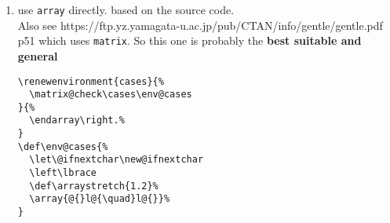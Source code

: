 \documentclass{article}
\begin{document}
\begin{enumerate}
    \item use \verb|array| directly. based on the source code.\\
          Also see https://ftp.yz.yamagata-u.ac.jp/pub/CTAN/info/gentle/gentle.pdf p51 which uses \verb|matrix|. So this one is probably the \textbf{best suitable and general}
          \begin{verbatim}
\renewenvironment{cases}{%
  \matrix@check\cases\env@cases
}{%
  \endarray\right.%
}
\def\env@cases{%
  \let\@ifnextchar\new@ifnextchar
  \left\lbrace
  \def\arraystretch{1.2}%
  \array{@{}l@{\quad}l@{}}%
}
          \end{verbatim}


\end{enumerate}
\end{document}
